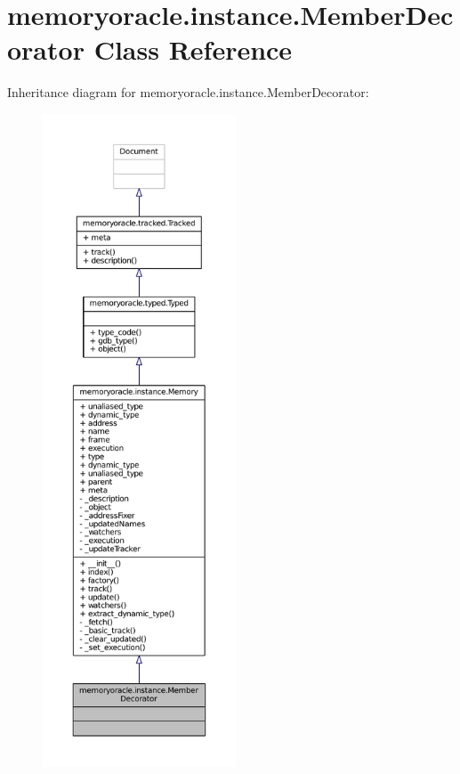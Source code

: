 \hypertarget{classmemoryoracle_1_1instance_1_1MemberDecorator}{}\section{memoryoracle.\+instance.\+Member\+Decorator Class Reference}
\label{classmemoryoracle_1_1instance_1_1MemberDecorator}


Inheritance diagram for memoryoracle.\+instance.\+Member\+Decorator\+:
\nopagebreak
\begin{figure}[H]
\begin{center}
\leavevmode
\includegraphics[height=550pt]{classmemoryoracle_1_1instance_1_1MemberDecorator__inherit__graph}
\end{center}
\end{figure}


